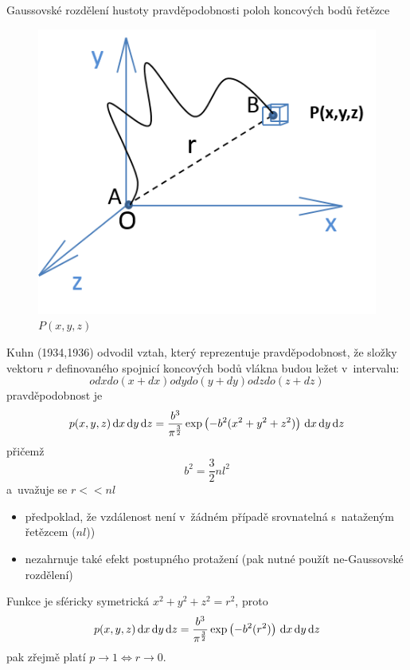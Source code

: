 Gaussovské rozdělení hustoty pravděpodobnosti poloh koncových bodů řetězce
\begin{figure}[H]
	\centering
	\includegraphics{Obrazky/kuhn}
	\caption{$P(x,y,z)$}
	\label{fig:kuhn}
\end{figure}
Kuhn (1934,1936) odvodil vztah, který reprezentuje pravděpodobnost, že složky vektoru $r$ definovaného spojnicí koncových bodů vlákna budou ležet v~intervalu:
\begin{equation}
od x do (x+dx)
od y do (y+dy)
od z do (z+dz)
\end{equation}
pravděpodobnost je
\begin{equation}
	p(x,y,z) \,\mathrm{d} x \,\mathrm{d} y \,\mathrm{d} z
	= \frac{b^3}{\pi^{\frac{3}{2}}} \exp\left(-b^2(x^2 + y^2 + z^2)\right) \,\mathrm{d} x \,\mathrm{d} y \,\mathrm{d} z
\end{equation}
přičemž
\begin{equation}
	b^2 = \frac{3}{2} n l^2
\end{equation}
a~uvažuje se $r << n l$
\begin{itemize}
	\item předpoklad, že vzdálenost není v~žádném případě srovnatelná s~nataženým řetězcem ($n l$)) 
	\item nezahrnuje také efekt postupného protažení (pak nutné použít ne-Gaussovské rozdělení)
\end{itemize}

Funkce je sféricky symetrická $x^2 + y^2 + z^2 = r^2$, proto
\begin{equation}
	p(x,y,z) \,\mathrm{d} x \,\mathrm{d} y \,\mathrm{d} z
	= \frac{b^3}{\pi^{\frac{3}{2}}} \exp\left(-b^2(r^2)\right) \,\mathrm{d} x \,\mathrm{d} y \,\mathrm{d} z
\end{equation}
pak zřejmě platí $p \rightarrow 1 \Leftrightarrow r \rightarrow 0$.

